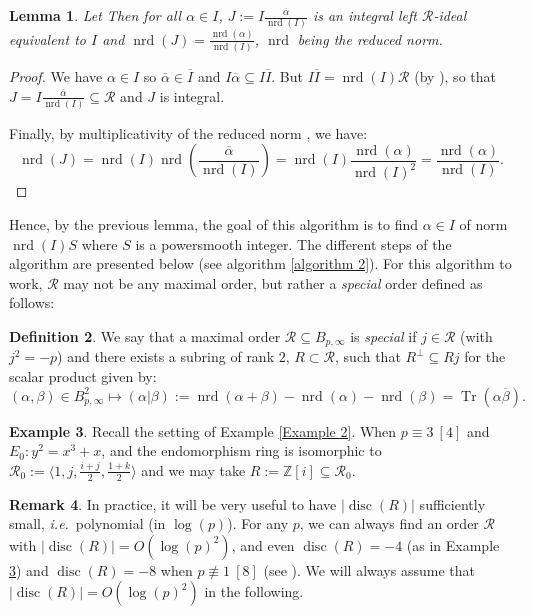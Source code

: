 \documentclass[a4paper,10pt]{report}
\theoremstyle{definition}
\newtheorem{Definition}{Definition}[chapter]
\theoremstyle{plain}
\newtheorem{Lemma}[Definition]{Lemma}
\theoremstyle{definition}
\newtheorem{Remark}[Definition]{Remark}
\newtheorem{Example}[Definition]{Example}
\newcommand{\ie}{\emph{i.e.}\ }
\newcommand{\Z}{\mathbb{Z}}
\newcommand{\m}[1]{\mathcal{#1}}
\renewcommand{\(}{\left(}
\renewcommand{\)}{\right)}
\DeclareMathOperator{\Tr}{Tr}
\DeclareMathOperator{\disc}{disc}
\DeclareMathOperator{\nrd}{nrd}
\begin{document}
\begin{Lemma}\label{Lemma 5}
Let  Then for all $\alpha\in I$, $J:=I\frac{\overline{\alpha}}{\nrd(I)}$ is an integral left $\m{R}$-ideal equivalent to $I$ and $\nrd(J)=\frac{\nrd(\alpha)}{\nrd(I)}$, $\nrd$ being the reduced norm.
\end{Lemma}

\begin{proof}
We have $\alpha\in I$ so $\overline{\alpha}\in \overline{I}$ and $I\overline{\alpha}\subseteq I\overline{I}$. But $I\overline{I}=\nrd(I)\m{R}$ (by \cite[16.6.14]{Voight}), so that $J=I\frac{\overline{\alpha}}{\nrd(I)}\subseteq \m{R}$ and $J$ is integral. 

Finally, by multiplicativity of the reduced norm \cite[Lemma 16.3.7]{Voight}, we have:
\[\nrd(J)=\nrd(I)\nrd\(\frac{\overline{\alpha}}{\nrd(I)}\)=\nrd(I)\frac{\nrd(\alpha)}{\nrd(I)^2}=\frac{\nrd(\alpha)}{\nrd(I)}.\]
\end{proof}

Hence, by the previous lemma, the goal of this algorithm is to find $\alpha\in I$ of norm $\nrd(I)S$ where $S$ is a powersmooth integer.  The different steps of the algorithm are presented below (see algorithm \ref{algorithm 2}). For this algorithm to work, $\m{R}$ may not be any maximal order, but rather a \emph{special} order defined as follows:

\begin{Definition}\label{Definition 2}
We say that a maximal order $\m{R}\subseteq B_{p,\infty}$ is \emph{special} if $j\in \m{R}$ (with $j^2=-p$) and there exists a subring of rank $2$, $R\subset\m{R}$, such that $R^\bot\subseteq Rj$ for the scalar product given by:
\[(\alpha,\beta)\in B_{p,\infty}^2\longmapsto (\alpha|\beta):=\nrd(\alpha+\beta)-\nrd(\alpha)-\nrd(\beta)=\Tr(\alpha\overline{\beta}).\]
\end{Definition}

\begin{Example}\label{Example 3}
Recall the setting of Example \ref{Example 2}. When $p\equiv 3 \ [4]$ and $E_0: y^2=x^3+x$,  and the endomorphism ring is isomorphic to $\m{R}_0:= \langle 1,j, \frac{i+j}{2},\frac{1+k}{2}\rangle$ and we may take $R:=\Z[i]\subseteq\m{R}_0$.
\end{Example}

\begin{Remark}
In practice, it will be very useful to have $|\disc(R)|$ sufficiently small, \ie  polynomial (in $\log(p)$).  For any $p$, we can always find an order $\m{R}$ with $|\disc(R)|=O(\log(p)^2)$, and even $\disc(R)=-4$ (as in Example \ref{Example 3}) and $\disc(R)=-8$ when $p\not\equiv 1 \ [8]$ (see \cite[section 2.3]{KLPT}). We will always assume that $|\disc(R)|=O(\log(p)^2)$ in the following.
\end{Remark}
\end{document}
